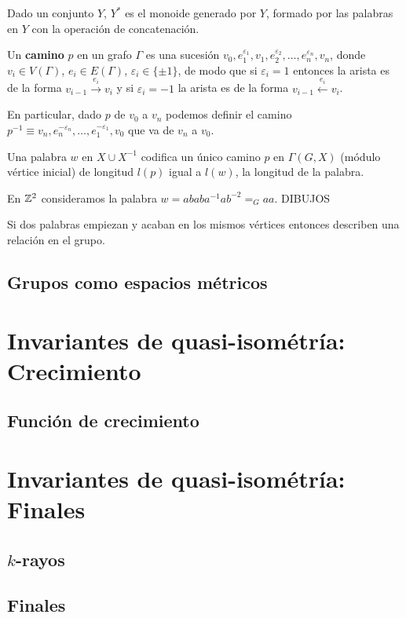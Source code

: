 \documentclass[twoside, 11pt]{article}
\begin{document}
Dado un conjunto $Y$, $Y^*$ es el monoide generado por $Y$, formado por las palabras en $Y$ con la operación de concatenación.

\begin{defi}
Un \textbf{camino} $p$ en un grafo $\Gamma$ es una sucesión $v_0,e_1^{\varepsilon_1}, v_1,e_2^{\varepsilon_2},\dots, e_n^{\varepsilon_n},v_n$, donde $v_i\in V(\Gamma)$, $e_i\in E(\Gamma)$, $\varepsilon_i\in\{\pm 1\}$, de modo que si $\varepsilon_i=1$ entonces la arista es de la forma $v_{i-1}\xrightarrow{e_i}v_{i}$ y si $\varepsilon_i=-1$ la arista es de la forma $v_{i-1}\xleftarrow{e_i}v_i$. 

En particular, dado $p$ de $v_0$ a $v_n$ podemos definir el camino $p^{-1}\equiv v_n,e_n^{-\varepsilon_n}, \dots, e_1^{-\varepsilon_1},v_0$ que va de $v_n$ a $v_0$. 
\end{defi}

Una palabra $w$ en $X\cup X^{-1}$ codifica un único camino $p$ en $\Gamma(G,X)$ (módulo vértice inicial) de longitud $l(p)$ igual a $l(w)$, la longitud de la palabra. 

\begin{ej}
En $\mathbb{Z}^2$ consideramos la palabra $w=ababa^{-1}ab^{-2}=_G aa$. DIBUJOS

Si dos palabras empiezan y acaban en los mismos vértices entonces describen una relación en el grupo. 
\end{ej}
  
\subsection{Grupos como espacios métricos}


\section{Invariantes de quasi-isométría: Crecimiento}
\subsection{Función de crecimiento}

\section{Invariantes de quasi-isométría: Finales}
\subsection{$k$-rayos}
\subsection{Finales}
\end{document}

